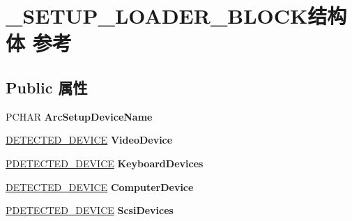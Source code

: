 \hypertarget{struct___s_e_t_u_p___l_o_a_d_e_r___b_l_o_c_k}{}\section{\+\_\+\+S\+E\+T\+U\+P\+\_\+\+L\+O\+A\+D\+E\+R\+\_\+\+B\+L\+O\+C\+K结构体 参考}
\label{struct___s_e_t_u_p___l_o_a_d_e_r___b_l_o_c_k}
\subsection*{Public 属性}
\begin{DoxyCompactItemize}
\item 
\mbox{\label{struct___s_e_t_u_p___l_o_a_d_e_r___b_l_o_c_k_a4d882aa9c5b4dfd1cfe5e22a8d8c51f7}} 
P\+C\+H\+AR {\bfseries Arc\+Setup\+Device\+Name}
\item 
\mbox{\label{struct___s_e_t_u_p___l_o_a_d_e_r___b_l_o_c_k_a8c2bcd9aa97ff6d6d1dc7340b3f5e9f6}} 
\hyperlink{struct___d_e_t_e_c_t_e_d___d_e_v_i_c_e}{D\+E\+T\+E\+C\+T\+E\+D\+\_\+\+D\+E\+V\+I\+CE} {\bfseries Video\+Device}
\item 
\mbox{\label{struct___s_e_t_u_p___l_o_a_d_e_r___b_l_o_c_k_a7c992409a8ec5acffda23211a871a1eb}} 
\hyperlink{struct___d_e_t_e_c_t_e_d___d_e_v_i_c_e}{P\+D\+E\+T\+E\+C\+T\+E\+D\+\_\+\+D\+E\+V\+I\+CE} {\bfseries Keyboard\+Devices}
\item 
\mbox{\label{struct___s_e_t_u_p___l_o_a_d_e_r___b_l_o_c_k_ad569c6b51ce4415ff2e0c2e28f5ca8be}} 
\hyperlink{struct___d_e_t_e_c_t_e_d___d_e_v_i_c_e}{D\+E\+T\+E\+C\+T\+E\+D\+\_\+\+D\+E\+V\+I\+CE} {\bfseries Computer\+Device}
\item 
\mbox{\label{struct___s_e_t_u_p___l_o_a_d_e_r___b_l_o_c_k_aadba7078d42dad3f9b25e65c95b1f2fa}} 
\hyperlink{struct___d_e_t_e_c_t_e_d___d_e_v_i_c_e}{P\+D\+E\+T\+E\+C\+T\+E\+D\+\_\+\+D\+E\+V\+I\+CE} {\bfseries Scsi\+Devices}
\item 
\mbox{\label{struct___s_e_t_u_p___l_o_a_d_e_r___b_l_o_c_k_a65ae28613651c5181f10cc5f036f5cda}} 

\end{DoxyCompactItemize}
